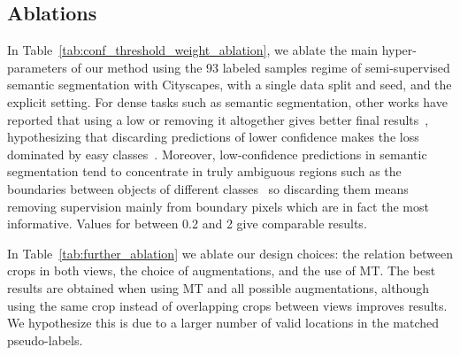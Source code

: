 \subsection{Ablations}
\label{sec:ablations}
In Table~\ref{tab:conf_threshold_weight_ablation}, we ablate the main hyper-parameters of our method using the 93 labeled samples regime of semi-supervised semantic segmentation with Cityscapes, with a single data split and seed, and the explicit setting.
For dense tasks such as semantic segmentation, other works have reported that using a low  or removing it altogether gives better final results~\cite{pseudoseg}, hypothesizing that discarding predictions of lower confidence makes the loss dominated by easy classes~\cite{pixmatch,ael}. Moreover, low-confidence predictions in semantic segmentation tend to concentrate in truly ambiguous regions such as the boundaries between objects of different classes~\cite{u2pl} so discarding them means removing supervision mainly from boundary pixels which are in fact the most informative. Values for  between 0.2 and 2 give comparable results.

In Table~\ref{tab:further_ablation} we ablate our design choices: the relation between crops in both views, the choice of augmentations, and the use of MT. The best results are obtained when using MT and all possible augmentations, although using the same crop instead of overlapping crops between views improves results. We hypothesize this is due to a larger number of valid locations in the matched pseudo-labels.




